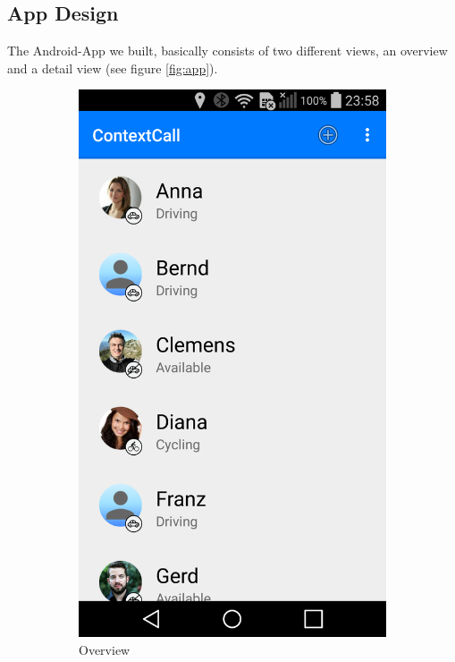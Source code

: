 \documentclass{sigchi}
\begin{document}
\subsection{App Design}
The Android-App we built, basically consists of two different views, an overview and a detail view (see figure \ref{fig:app}).
\newline
\begin{figure}[H]
\centering
\begin{subfigure}{.23\textwidth}
  \centering
  \includegraphics[width=.7\linewidth]{figures/app_1}
  \caption{Overview}
  \label{fig:app_1}
\end{subfigure}
\begin{subfigure}{.23\textwidth}
  \centering

\end{subfigure}
\end{figure}
\end{document}
